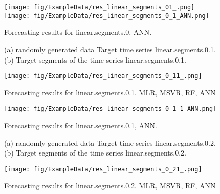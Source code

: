 \documentclass[12pt]{article}
\begin{document}
\begin{figure}
\centering
\texttt{[image: fig/ExampleData/res\_linear\_segments\_01\_.png]}
%
%
\texttt{[image: fig/ExampleData/res\_linear\_segments\_0\_1\_ANN.png]}
\caption{Forecasting results for	linear.segments.0,	ANN.	}
\end{figure}


\begin{figure}
\centering
{}
\caption{(a)	randomly generated data	Target time series	linear.segments.0.1.		(b)		Target segments of the time series	linear.segments.0.1.		}
\end{figure}





\begin{figure}
\centering
\texttt{[image: fig/ExampleData/res\_linear\_segments\_0\_11\_.png]}
\caption{Forecasting results for	linear.segments.0.1.	MLR, MSVR, RF, ANN}
\end{figure}


\begin{figure}
\centering
\texttt{[image: fig/ExampleData/res\_linear\_segments\_0\_1\_1\_ANN.png]}
\caption{Forecasting results for	linear.segments.0.1,	ANN.	}
\end{figure}


\begin{figure}
\centering
{}
\caption{(a)	randomly generated data	Target time series	linear.segments.0.2.		(b)		Target segments of the time series	linear.segments.0.2.		}
\end{figure}




\begin{figure}
\centering
\texttt{[image: fig/ExampleData/res\_linear\_segments\_0\_21\_.png]}
\caption{Forecasting results for	linear.segments.0.2.	MLR, MSVR, RF, ANN}
\end{figure}
\end{document}
